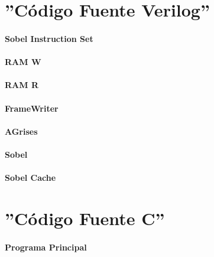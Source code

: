 \documentclass[a4paper,12pt,titlepage,final]{book}
\begin{document}
\chapter{''Código Fuente Verilog''}
\subsubsection{Sobel Instruction Set}

\subsubsection{RAM W}

\subsubsection{RAM R}

\subsubsection{FrameWriter}

\subsubsection{AGrises}

\subsubsection{Sobel}

\subsubsection{Sobel Cache}


\chapter{''Código Fuente C''}
\subsubsection{Programa Principal}
\lstset{
language=c
}


\backmatter



\end{document}
